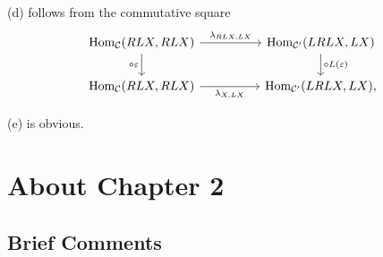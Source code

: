 \documentclass[12pt]{article}
\theoremstyle{remark}
\theoremstyle{definition}
\newcommand{\C}{\mathcal C}
\newcommand{\ee}{\varepsilon}
\DeclareMathOperator{\Hom}{Hom}
\begin{document}
(d) follows from the commutative square 
$$
\begin{tikzcd}
\Hom_\C(RLX,RLX)\ar{d}[swap]{\circ\ee}\ar{rr}{\lambda_{RLX,LX}}&&\Hom_{\C'}(LRLX,LX)\ar{d}{\circ L(\ee)}\\
\Hom_\C(RLX,RLX)\ar{rr}[swap]{\lambda_{X,LX}}&&\Hom_{\C'}(LRLX,LX),
\end{tikzcd}
$$ 

(e) is obvious.


\section{About Chapter 2}

\subsection{Brief Comments}
\end{document}
